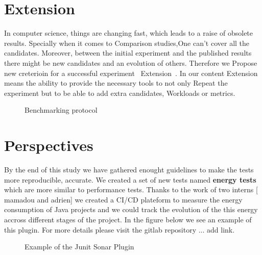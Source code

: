 \section{Extension}
In computer science, things are changing fast, which leads to a raise of obsolete results. Specially when it comes to Comparison studies,One can't cover all the candidates. 
Moreover, between the initial experiment and the published results there might be new candidates and an evolution of
others. Therefore we Propose new creterioin for a successful experiment ~Extension~.
In our content Extension means the ability to provide the necessary tools to not only Repeat the experiment but to be able to add extra candidates, Workloads or metrics.


\begin{figure}%
    \caption{Benchmarking protocol}\label{fig:benchmarkingprotocol}
\end{figure}


\section{Perspectives}
By the end of this study we have gathered enought guidelines to make the tests more reproducible, accurate.
We created a set of new tests named \textbf{energy tests} which are more similar to performance tests. Thanks to the work of two interns [ mamadou and adrien] we created a CI/CD plateform to measure the energy consumption of Java projects and we could track the evolution of the this energy accross different stages of the project.
In the figure below we see an example of this plugin.
For more details please visit the gitlab repository ... add link.

\begin{figure}%
    \caption{Example of the Junit Sonar Plugin}\label{fig:sonar_plugin}
\end{figure}

